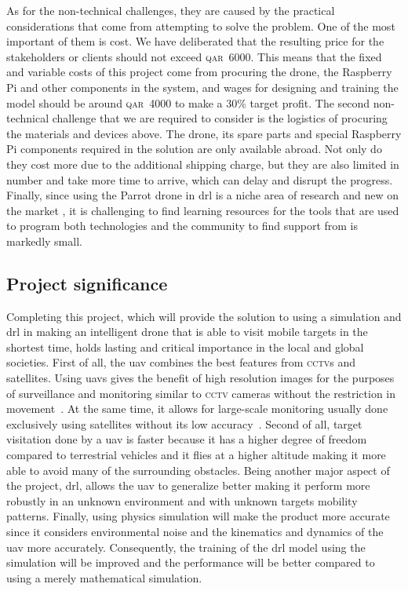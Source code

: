 \documentclass[../main.tex]{subfiles}
\begin{document}
As for the non-technical challenges, they are caused
by the practical considerations that come
from attempting to solve the problem.
One of the most important of them is cost. 
We have deliberated that
the resulting price for the stakeholders or clients
should not exceed \textsc{qar}~6000. 
This means that the fixed and variable costs of this project
come from procuring the \anafi drone, the Raspberry Pi and other
components in the system, 
and wages for designing and training the model  
should be around \textsc{qar}~4000 to make a 30\% target profit.
The second non-technical challenge that we are required to consider
is the logistics of procuring the materials and devices above.
The \anafi drone, its spare parts and special Raspberry Pi
components required in the solution are only available abroad.
Not only do they cost more due to the additional shipping charge,
but they are also limited in number 
and take more time to arrive, which can delay 
and disrupt the progress.
Finally, since using the Parrot \anafi drone in \gls{drl}
is a niche area of research and new on the market ,
it is challenging to find learning resources for the tools
that are used to program both technologies
and the community to find support from is markedly small.

\subsection{Project significance}

Completing this project, which will provide the solution
to using a simulation and \gls{drl} in making an intelligent drone 
that is able to visit mobile targets in the shortest time,
holds lasting and critical importance 
in the local and global societies.
First of all, the \gls{uav} combines the best features
from \textsc{cctv}s and satellites.
Using \glspl{uav} gives the benefit of high resolution images
for the purposes of surveillance and monitoring
similar to \textsc{cctv} cameras 
without the restriction in movement~\cite{Sha19}.
At the same time, it allows for large-scale monitoring 
usually done exclusively using satellites 
without its low accuracy~\cite{Sha19}.
Second of all, target visitation done by a \gls{uav}
is faster because it has a higher degree of freedom
compared to terrestrial vehicles and
it flies at a higher altitude 
making it more able to avoid 
many of the surrounding obstacles.
Being another major aspect of the project, \gls{drl}, 
allows the \gls{uav} to generalize better
making it perform more robustly
in an unknown environment
and with unknown targets mobility patterns.
Finally, using physics simulation will make the product 
more accurate since it considers 
environmental noise and
the kinematics and dynamics of the \gls{uav} more accurately.
Consequently, the training of the \gls{drl} model 
using the simulation will be improved 
and the performance will be better
compared to using a merely mathematical simulation.
\end{document}
